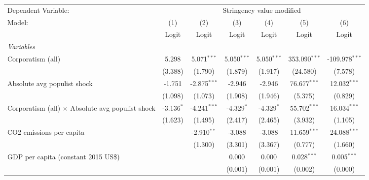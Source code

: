 
\begingroup
\centering
\begin{tabular}{lcccccc}
   \toprule
   Dependent Variable: & \multicolumn{6}{c}{Stringency value modified}\\
   Model:                                                  & (1)          & (2)            & (3)           & (4)           & (5)             & (6)\\  
                                                           &  Logit       & Logit          & Logit         & Logit         & Logit           & Logit\\  
   \midrule
   \emph{Variables}\\
   Corporatism (all)                                       & 5.298        & 5.071$^{***}$  & 5.050$^{***}$ & 5.050$^{***}$ & 353.090$^{***}$ & -109.978$^{***}$\\   
                                                           & (3.388)      & (1.790)        & (1.879)       & (1.917)       & (24.580)        & (7.578)\\   
   Absolute avg populist shock                             & -1.751       & -2.875$^{***}$ & -2.946        & -2.946        & 76.677$^{***}$  & 12.032$^{***}$\\   
                                                           & (1.098)      & (1.073)        & (1.908)       & (1.946)       & (5.375)         & (0.829)\\   
   Corporatism (all) $\times$ Absolute avg populist shock  & -3.136$^{*}$ & -4.241$^{***}$ & -4.329$^{*}$  & -4.329$^{*}$  & 55.702$^{***}$  & 16.034$^{***}$\\   
                                                           & (1.623)      & (1.495)        & (2.417)       & (2.465)       & (3.932)         & (1.105)\\   
   CO2 emissions per capita                                &              & -2.910$^{**}$  & -3.088        & -3.088        & 11.659$^{***}$  & 24.088$^{***}$\\   
                                                           &              & (1.300)        & (3.301)       & (3.367)       & (0.777)         & (1.660)\\   
   GDP per capita (constant 2015 US\$)                     &              &                & 0.000         & 0.000         & 0.028$^{***}$   & 0.005$^{***}$\\   
                                                           &              &                & (0.001)       & (0.001)       & (0.002)         & (0.000)\\   

\end{tabular}
